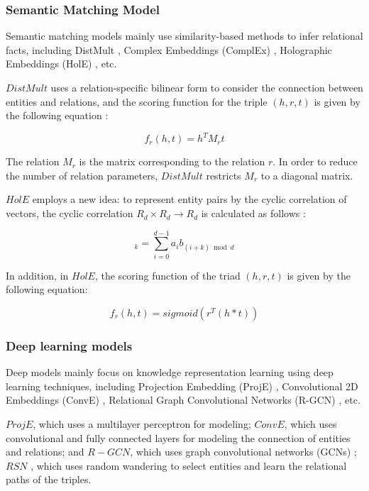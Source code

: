 \documentclass[sigconf]{acmart}
\begin{document}
{\subsubsection{Semantic Matching Model}
Semantic matching models mainly use similarity-based methods to infer relational facts, including DistMult \cite{yang2014embedding}, Complex Embeddings (ComplEx) \cite{trouillon2016complex}, Holographic Embeddings (HolE) \cite{nickel2016holographic}, etc.

$DistMult$ \cite{yang2014embedding} uses a relation-specific bilinear form to consider the connection between entities and relations, and the scoring function for the triple $(h,r,t)$ is given by the following equation :

\begin{equation}
    f_r(h,t)=h^TM_rt
\end{equation}

The relation $M_r$ is the matrix corresponding to the relation $r$. In order to reduce the number of relation parameters, $DistMult$ restricts $M_r$ to a diagonal matrix.

$HolE$ \cite{nickel2016holographic} employs a new idea: to represent entity pairs by the cyclic correlation of vectors, the cyclic correlation $ R_d \times R_d \rightarrow R_d $ is calculated as follows : 

\begin{equation}
    [a * b]_{k}=\sum_{i=0}^{d-1} a_{i} b_{(i+k) \bmod d}
\end{equation}

In addition, in $HolE$, the scoring function of the triad $(h,r,t)$ is given by the following equation:

\begin{equation}
    f_r(h,t) = sigmoid(r^T(h*t))
\end{equation}

\subsubsection{Deep learning models}

Deep models mainly focus on knowledge representation learning using deep learning techniques, including Projection Embedding (ProjE) \cite{shi2017proje}, Convolutional 2D Embeddings (ConvE) \cite{dettmers2018convolutional}, Relational Graph Convolutional Networks (R-GCN) \cite{schlichtkrull2018modeling}, etc.

$ProjE$, which uses a multilayer perceptron for modeling; $ConvE$, which uses convolutional and fully connected layers for modeling the connection of entities and relations; and $R-GCN$, which uses graph convolutional networks (GCNs) \cite{kipf2016semi}; $RSN$ \cite{guo2019learning}, which uses random wandering to select entities and learn the relational paths of the triples.

}
\end{document}
